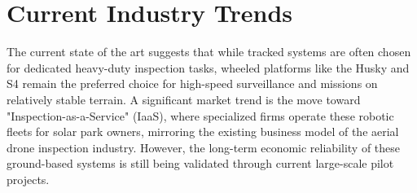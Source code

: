 \section{Current Industry Trends}
The current state of the art suggests that while tracked systems are often chosen for dedicated heavy-duty inspection tasks, wheeled platforms like the Husky and S4 remain the preferred choice for high-speed surveillance and missions on relatively stable terrain. 
A significant market trend is the move toward "Inspection-as-a-Service" (IaaS), where specialized firms operate these robotic fleets for solar park owners, mirroring the existing business model of the aerial drone inspection industry. 
However, the long-term economic reliability of these ground-based systems is still being validated through current large-scale pilot projects.

